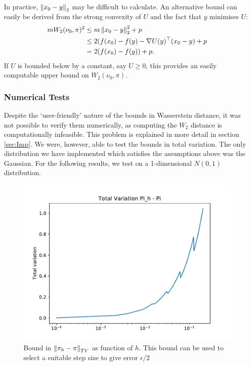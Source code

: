 \begin{note}
    In practice, $\norm{x_0-y}_2$ may be difficult to calculate.  An alternative bound can easily be derived from the strong convexity of $U$ and the fact that $y$ minimises $U$:
    \begin{align*}
        m W_2(\nu_0, \pi)^2 &\leq m \norm{x_0-y}_2^2 + p\\
        &\leq 2(f(x_0) - f(y) - \nabla U(y)^{\top}(x_0-y) + p\\
        &= 2(f(x_0)-f(y))+p.
    \end{align*}
    If $U$ is bounded below by a constant, say $U \geq 0$, this provides an easily computable upper bound on $W_2(\nu_0, \pi)$.
\end{note}

\subsubsection{Numerical Tests}
Despite the `user-friendly' nature of the bounds in Wasserstein distance, it was not possible to verify them numerically, as computing the $W_2$ distance is computationally infeasible.  This problem is explained in more detail in section \ref{sec:Imp}.  We were, however, able to test the bounds in total variation.  The only distribution we have implemented which satisfies the assumptions above was the Gaussian.  For the following results, we test on a 1-dimensional $N(0,1)$ distribution.

\begin{figure}[H]
	\centering
		\includegraphics[height=0.35\textheight]{WriteUp/DM_Pih.pdf}
	\caption{Bound in $\norm{\pi_h - \pi}_{TV}$ as function of $h$.  This bound can be used to select a suitable step size to give error $\epsilon/2$}
	\label{fig:DM_Pih}
\end{figure}

